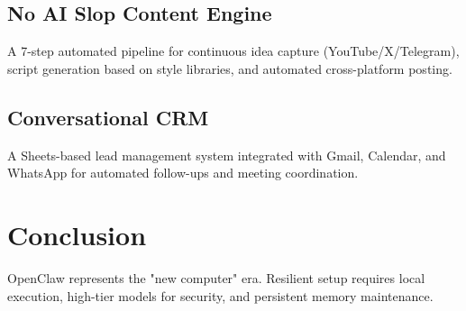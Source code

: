 \documentclass{article}
\begin{document}
\subsection{No AI Slop Content Engine}
A 7-step automated pipeline for continuous idea capture (YouTube/X/Telegram), script generation based on style libraries, and automated cross-platform posting.

\subsection{Conversational CRM}
A Sheets-based lead management system integrated with Gmail, Calendar, and WhatsApp for automated follow-ups and meeting coordination.

\section{Conclusion}
OpenClaw represents the "new computer" era. Resilient setup requires local execution, high-tier models for security, and persistent memory maintenance.
\end{document}
